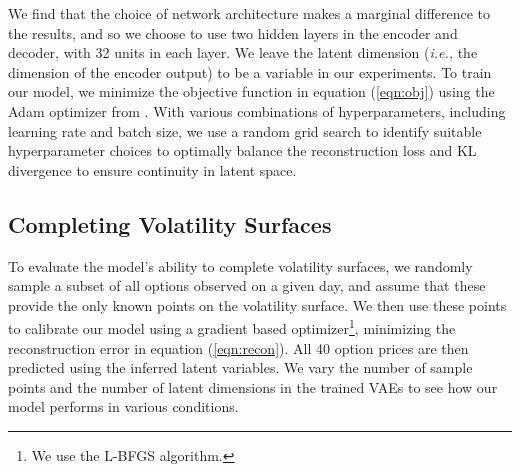 \documentclass[12pt]{article}
\begin{document}
We find that the choice of network architecture makes a marginal difference to the results, and so we choose to use two hidden layers in the encoder and decoder, with 32 units in each layer.   We leave the latent dimension (\textit{i.e.,} the dimension of the encoder output) to be a variable in our experiments.
To train our model, we minimize the objective function in equation (\ref{eqn:obj}) using the Adam optimizer from \citet{adam}. With various combinations of hyperparameters, including learning rate and batch size, we use a random grid search to identify suitable hyperparameter choices to optimally balance the reconstruction loss and KL divergence to ensure continuity in latent space. 






\subsection{Completing Volatility Surfaces}\label{fill_blanks}
To evaluate the model's ability to complete volatility surfaces, we randomly sample a subset of all options observed on a given day, and assume that these provide the only known points on the volatility surface. We then use these points to calibrate our model using a gradient based optimizer\footnote{We use the L-BFGS algorithm.}, minimizing the reconstruction error in equation (\ref{eqn:recon}). All 40 option prices are then predicted using the inferred latent variables. We vary the number of sample points and the number of latent dimensions in the trained VAEs to see how our model performs in various conditions.
\end{document}
